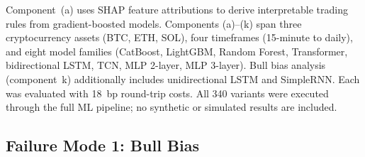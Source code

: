 \documentclass[preprint,12pt,authoryear]{elsarticle}
\begin{document}
\begin{table}[htbp]
\centering
\caption{Composition of the 340-variant strategy universe.}
\label{tab:universe}
\small
{}
\end{table}

Component~(a) uses SHAP feature attributions \citep{lundberg2017unified} to derive interpretable trading rules from gradient-boosted models. Components (a)--(k) span three cryptocurrency assets (BTC, ETH, SOL), four timeframes (15-minute to daily), and eight model families (CatBoost, LightGBM, Random Forest, Transformer, bidirectional LSTM, TCN, MLP 2-layer, MLP 3-layer). Bull bias analysis (component~k) additionally includes unidirectional LSTM and SimpleRNN. Each was evaluated with 18~bp round-trip costs. All 340 variants were executed through the full ML pipeline; no synthetic or simulated results are included.

\subsection{Failure Mode 1: Bull Bias}
\end{document}
